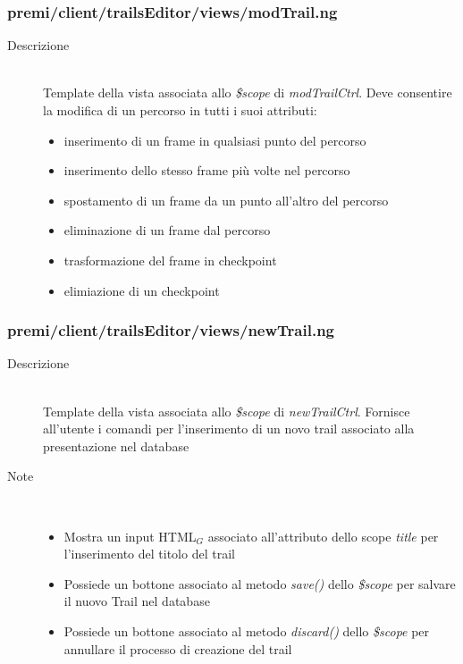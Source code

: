 \subsubsection{premi/client/trailsEditor/views/modTrail.ng}

\begin{description}
\item[Descrizione] \hfill \\
	Template della vista associata allo \textit{\$scope} di \textit{modTrailCtrl}. Deve consentire la modifica di un percorso in tutti i suoi attributi:
	\begin{itemize}
			\item inserimento di un frame in qualsiasi punto del percorso
			\item inserimento dello stesso frame più volte nel percorso
						\item spostamento di un frame da un punto all'altro del percorso
			\item eliminazione di un frame dal percorso
			\item trasformazione del frame in checkpoint
			\item elimiazione di un checkpoint
	\end{itemize}
\end{description}

\subsubsection{premi/client/trailsEditor/views/newTrail.ng}

\begin{description}
\item[Descrizione] \hfill \\
	Template della vista associata allo \textit{\$scope} di \textit{newTrailCtrl}. Fornisce all'utente i comandi per l'inserimento di un novo trail associato alla presentazione nel database
\item[Note] \hfill \\
	\begin{itemize}
			\item Mostra un input HTML$_G$ associato all'attributo dello scope \textit{title} per l'inserimento del titolo del trail
			\item Possiede un bottone associato al metodo \textit{save()} dello \textit{\$scope} per salvare il nuovo Trail nel database
			\item Possiede un bottone associato al metodo \textit{discard()} dello \textit{\$scope} per annullare il processo di creazione del trail
	\end{itemize}
\end{description}

